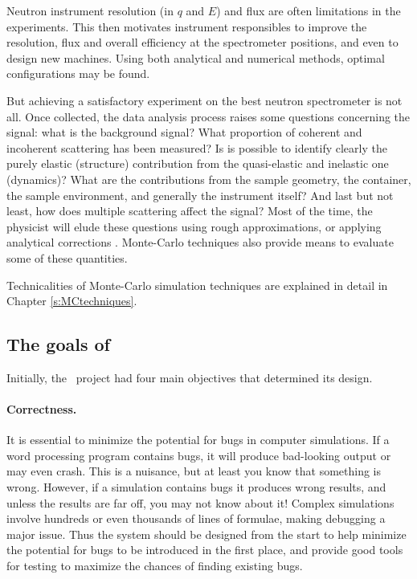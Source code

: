 Neutron instrument resolution (in $q$ and $E$) and flux are often limitations in the
experiments. This then motivates instrument responsibles to improve
the resolution, flux and overall efficiency at the spectrometer positions, and
even to design new machines. Using both analytical and numerical
methods, optimal configurations may be found.

But achieving a satisfactory experiment on the best neutron
spectrometer is not all. Once collected, the data analysis process
raises some questions concerning the signal: what is the background
signal? What proportion of coherent and incoherent scattering has
been measured? Is is possible to identify clearly the purely elastic
(structure) contribution from the quasi-elastic and inelastic one
(dynamics)? What are the contributions from the sample geometry, the
container, the sample environment, and generally the instrument
itself? And last but not least, how does multiple scattering affect the
signal? Most of the time, the physicist will elude these questions
using rough approximations, or applying analytical corrections
\cite{Copley86}. Monte-Carlo techniques also provide means to evaluate
some of these quantities. 

Technicalities of Monte-Carlo simulation
techniques are explained in detail in Chapter \ref{s:MCtechniques}.

\subsection{The goals of \MCS}
\label{s:goals}

Initially, the \MCS\ project had four main objectives
that determined its design.

\paragraph{Correctness.}
It is essential to minimize the potential for bugs in computer
simulations.  If a word processing program contains bugs, it will
produce bad-looking output or may even crash. This is a nuisance, but at
least you know that something is wrong. However, if a simulation
contains bugs it produces wrong results, and unless the results are far
off, you may not know about it! Complex simulations involve hundreds or
even thousands of lines of formulae, making debugging a major issue. Thus the
system should be designed from the start to help minimize the potential
for bugs to be introduced in the first place, and provide good tools for
testing to maximize the chances of finding existing bugs.
%
